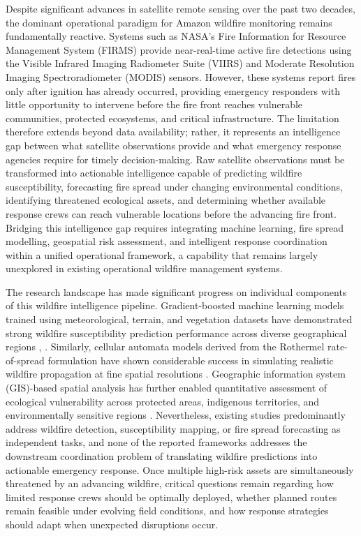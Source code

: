 \documentclass{ieeeaccess}
\begin{document}
Despite significant advances in satellite remote sensing over the past two decades, the dominant operational paradigm for Amazon wildfire monitoring remains fundamentally reactive. Systems such as NASA's Fire Information for Resource Management System (FIRMS) provide near-real-time active fire detections using the Visible Infrared Imaging Radiometer Suite (VIIRS) and Moderate Resolution Imaging Spectroradiometer (MODIS) sensors. However, these systems report fires only after ignition has already occurred, providing emergency responders with little opportunity to intervene before the fire front reaches vulnerable communities, protected ecosystems, and critical infrastructure. The limitation therefore extends beyond data availability; rather, it represents an intelligence gap between what satellite observations provide and what emergency response agencies require for timely decision-making. Raw satellite observations must be transformed into actionable intelligence capable of predicting wildfire susceptibility, forecasting fire spread under changing environmental conditions, identifying threatened ecological assets, and determining whether available response crews can reach vulnerable locations before the advancing fire front. Bridging this intelligence gap requires integrating machine learning, fire spread modelling, geospatial risk assessment, and intelligent response coordination within a unified operational framework, a capability that remains largely unexplored in existing operational wildfire management systems.

The research landscape has made significant progress on individual components of this wildfire intelligence pipeline. Gradient-boosted machine learning models trained using meteorological, terrain, and vegetation datasets have demonstrated strong wildfire susceptibility prediction performance across diverse geographical regions \cite{1}, \cite{2}. Similarly, cellular automata models derived from the Rothermel rate-of-spread formulation have shown considerable success in simulating realistic wildfire propagation at fine spatial resolutions \cite{8}. Geographic information system (GIS)-based spatial analysis has further enabled quantitative assessment of ecological vulnerability across protected areas, indigenous territories, and environmentally sensitive regions \cite{7}. Nevertheless, existing studies predominantly address wildfire detection, susceptibility mapping, or fire spread forecasting as independent tasks, and none of the reported frameworks addresses the downstream coordination problem of translating wildfire predictions into actionable emergency response. Once multiple high-risk assets are simultaneously threatened by an advancing wildfire, critical questions remain regarding how limited response crews should be optimally deployed, whether planned routes remain feasible under evolving field conditions, and how response strategies should adapt when unexpected disruptions occur.
\end{document}
